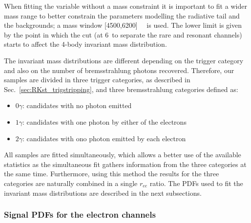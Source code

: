 When fitting the variable without a \jpsi mass constraint it is important to fit a wider mass range to better constrain the 
parameters modelling the radiative tail and the backgrounds; a mass window [4500,6200]~\mevcc~ is used. The lower limit 
is given by the point in which the \qsq cut (at 6~\gevgevcccc to separate the rare and resonant channels)
starts to affect the 4-body invariant mass distribution. 
%
%

The invariant mass distributions are different depending on the
trigger category and also on the number of bremsstrahlung photons recovered.
Therefore, our samples are divided in three trigger categories, as described in
Sec.~\ref{sec:RKst_trigstripping}, and three bremsstrahlung categories defined as:
%
\begin{itemize}
\item $0\gamma$: candidates with no photon emitted
\item $1\gamma$: candidates with one photon by either of the electrons
\item $2\gamma$: candidates with ono photon emitted by each electron
\end{itemize}
%
All samples are fitted simultaneously, which allows a better use of the available statistics 
as the simultaneous fit gathers information from the three categories at the same time.
Furthermore, using this method the results for the three categories are
naturally combined in a single $r_{ee}$ ratio.
%
The PDFs used to fit the invariant mass distributions are described in the next subsections.



\subsubsection{Signal PDFs for the electron channels}
\label{sec:fit_ee_central}


